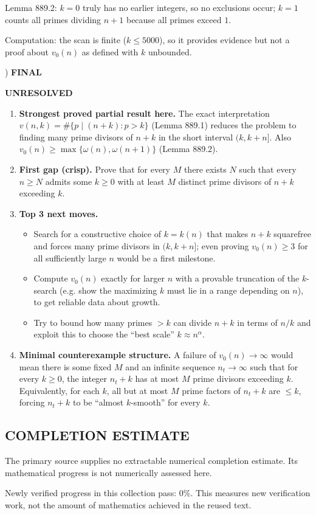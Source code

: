 \noindent Lemma 889.2: $k=0$ truly has no earlier integers, so no exclusions occur; $k=1$ counts all primes dividing $n+1$ because all primes exceed $1$.

\noindent Computation: the scan is finite ($k\le 5000$), so it provides evidence but not a proof about $v_0(n)$ as defined with $k$ unbounded.

) \textbf{FINAL}

\noindent \textbf{UNRESOLVED}
\begin{enumerate}
\item[(i)] \textbf{Strongest proved partial result here.} The exact interpretation $v(n,k)=\#\{p\mid(n+k):p>k\}$ (Lemma 889.1) reduces the problem to finding many prime divisors of $n+k$ in the short interval $(k,k+n]$. Also $v_0(n)\ge \max\{\omega(n),\omega(n+1)\}$ (Lemma 889.2).
\item[(ii)] \textbf{First gap (crisp).} Prove that for every $M$ there exists $N$ such that every $n\ge N$ admits some $k\ge 0$ with at least $M$ distinct prime divisors of $n+k$ exceeding $k$.
\item[(iii)] \textbf{Top 3 next moves.}
  \begin{itemize}
  \item Search for a constructive choice of $k=k(n)$ that makes $n+k$ squarefree and forces many prime divisors in $(k,k+n]$; even proving $v_0(n)\ge 3$ for all sufficiently large $n$ would be a first milestone.
  \item Compute $v_0(n)$ exactly for larger $n$ with a provable truncation of the $k$-search (e.g. show the maximizing $k$ must lie in a range depending on $n$), to get reliable data about growth.
  \item Try to bound how many primes $>k$ can divide $n+k$ in terms of $n/k$ and exploit this to choose the ``best scale'' $k\approx n^{\alpha}$.
  \end{itemize}
\item[(iv)] \textbf{Minimal counterexample structure.} A failure of $v_0(n)\to\infty$ would mean there is some fixed $M$ and an infinite sequence $n_t\to\infty$ such that for every $k\ge 0$, the integer $n_t+k$ has at most $M$ prime divisors exceeding $k$. Equivalently, for each $k$, all but at most $M$ prime factors of $n_t+k$ are $\le k$, forcing $n_t+k$ to be ``almost $k$-smooth'' for every $k$.
\end{enumerate}



\subsection*{COMPLETION ESTIMATE}
The primary source supplies no extractable numerical completion estimate. Its mathematical progress is not numerically assessed here.

Newly verified progress in this collection pass: $0\%$. This measures new verification work, not the amount of mathematics achieved in the reused text.
